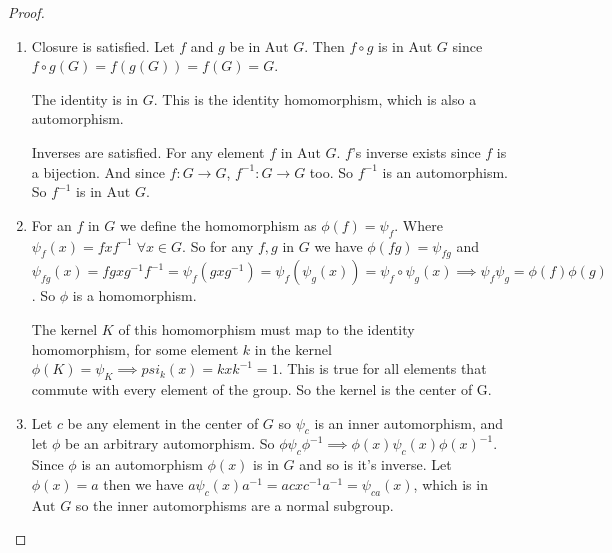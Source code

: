 \documentclass[12pt]{article}
\newcommand{\aut}{\text{Aut }}
\begin{document}
\begin{proof}
    \begin{enumerate}
        \item Closure is satisfied. Let $f$ and $g$ be in $\aut{G}$.
            Then $f \circ g$ is in $\aut{G}$ since $f \circ g(G) =
            f(g(G)) = f(G) = G$.

            The identity is in $G$. This is the identity homomorphism,
            which is also a automorphism.

            Inverses are satisfied. For any element $f$ in $\aut{G}$.
            $f$'s inverse exists since $f$ is a bijection. And since $f:
            G \rightarrow G$, $f^{-1}:G \rightarrow G$ too. So $f^{-1}$
            is an automorphism. So $f^{-1}$ is in $\aut{G}$.

        \item  For an $f$ in $G$ we define the homomorphism as $\phi(f)
            = \psi_f$. Where $\psi_f(x) = fxf^{-1} \; \forall x \in G$.
            So for any $f, g$ in $G$ we have $\phi(fg) = \psi_{fg}$ and
            $\psi_{fg}(x) = fgxg^{-1}f^{-1} = \psi_f(gxg^{-1}) =
            \psi_f( \psi_g(x)) = \psi_f \circ \psi_g(x) \implies \psi_f
            \psi_g = \phi(f)\phi(g)$. So $\phi$ is a homomorphism.

            The kernel $K$ of this homomorphism must map to the identity
            homomorphism, for some element $k$ in the kernel  $\phi(K) =
            \psi_K \implies psi_k(x) = kxk^{-1} = 1$. This is true for
            all elements that commute with every element of the group.
            So the kernel is the center of G.

        \item Let $c$ be any element in the center of $G$ so $\psi_c$ is
            an inner automorphism, and let $\phi$ be an arbitrary
            automorphism.  So $\phi \psi_c \phi^{-1} \implies \phi(x)
            \psi_c(x) \phi(x)^{-1}$. Since $\phi$ is an automorphism
            $\phi(x)$ is in $G$ and so is it's inverse. Let $\phi(x) =
            a$ then we have $a\psi_c(x)a^{-1} = acxc^{-1}a^{-1} =
            \psi_{ca}(x)$, which is in $\aut{G}$ so the inner
            automorphisms are a normal subgroup.

    \end{enumerate}

\end{proof}

\end{document}

